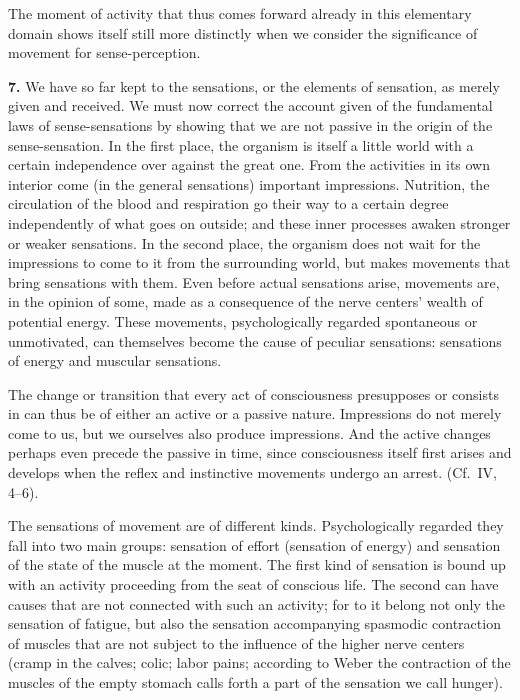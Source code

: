\documentclass[12pt,a4paper]{book}
\newcommand{\opage}[1]{\marginnote{\footnotesize\textit{[#1]}}}
\begin{document}
The moment of activity that thus comes forward already in this
elementary domain shows itself still more distinctly when we consider
the significance of movement for sense-perception.

\textbf{7.} We have so far kept to the sensations, or the elements of
sensation, as merely given and received. We must now correct the account
given of the fundamental laws of sense-sensations by showing that we are
not passive in the origin of the sense-sensation. In the first place,
the organism is itself a little world with a certain independence over
against the great one. From the activities in its own interior come (in
the general sensations) important impressions. Nutrition, the
circulation of the blood and respiration go their way to a certain
degree independently of what goes on outside; and these inner processes
awaken stronger or weaker sensations. In the second place, the organism
does not wait for the impressions to come to it from the surrounding
world, but makes movements that bring sensations with them. Even before
actual sensations arise, movements are, in the opinion of some, made as
\opage{145}a consequence of the nerve centers' wealth of potential
energy. These movements, psychologically regarded spontaneous or
unmotivated, can themselves become the cause of peculiar sensations:
sensations of energy and muscular sensations.

The change or transition that every act of consciousness presupposes or
consists in can thus be of either an active or a passive nature.
Impressions do not merely come to us, but we ourselves also produce
impressions. And the active changes perhaps even precede the passive in
time, since consciousness itself first arises and develops when the
reflex and instinctive movements undergo an arrest. (Cf.\ IV, 4--6).

The sensations of movement are of different kinds. Psychologically
regarded they fall into two main groups: sensation of effort (sensation
of energy) and sensation of the state of the muscle at the moment. The
first kind of sensation is bound up with an activity proceeding from the
seat of conscious life. The second can have causes that are not
connected with such an activity; for to it belong not only the sensation
of fatigue, but also the sensation accompanying spasmodic contraction of
muscles that are not subject to the influence of the higher nerve
centers (cramp in the calves; colic; labor pains; according to Weber the
contraction of the muscles of the empty stomach calls forth a part of
the sensation we call hunger).
\end{document}
